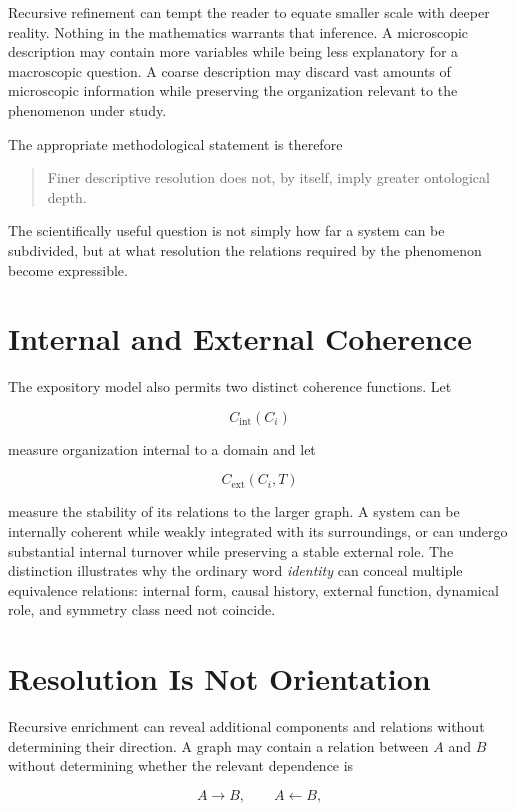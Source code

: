 Recursive refinement can tempt the reader to equate smaller scale with deeper reality. Nothing in the mathematics warrants that inference. A microscopic description may contain more variables while being less explanatory for a macroscopic question. A coarse description may discard vast amounts of microscopic information while preserving the organization relevant to the phenomenon under study.

The appropriate methodological statement is therefore

\begin{quote}
Finer descriptive resolution does not, by itself, imply greater ontological depth.
\end{quote}

The scientifically useful question is not simply how far a system can be subdivided, but at what resolution the relations required by the phenomenon become expressible.

\section{Internal and External Coherence}

The expository model also permits two distinct coherence functions. Let

\[
C_{\mathrm{int}}(C_i)
\]

measure organization internal to a domain and let

\[
C_{\mathrm{ext}}(C_i,T)
\]

measure the stability of its relations to the larger graph. A system can be internally coherent while weakly integrated with its surroundings, or can undergo substantial internal turnover while preserving a stable external role. The distinction illustrates why the ordinary word \emph{identity} can conceal multiple equivalence relations: internal form, causal history, external function, dynamical role, and symmetry class need not coincide.

\section{Resolution Is Not Orientation}

Recursive enrichment can reveal additional components and relations without determining their direction. A graph may contain a relation between $A$ and $B$ without determining whether the relevant dependence is

\[
A\longrightarrow B,
\qquad
A\longleftarrow B,
\]

